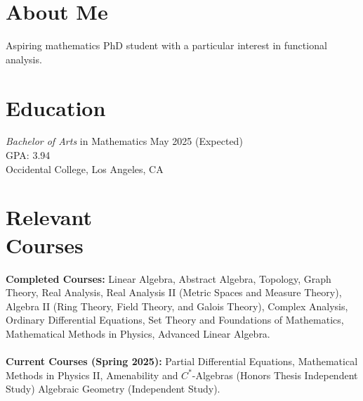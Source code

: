 \documentclass[margin, 12pt]{res} %
\begin{document}
\begin{resume}

\section{\sc About Me}
Aspiring mathematics PhD student with a particular interest in functional analysis.

\section{\sc Education}

{\sl Bachelor of Arts} in Mathematics \hfill May 2025 (Expected) \\
GPA: 3.94\\
Occidental College, Los Angeles, CA 
\section{\sc Relevant \\ Courses}

\textbf{Completed Courses:} Linear Algebra, Abstract Algebra, Topology, Graph Theory, Real Analysis, Real Analysis II (Metric Spaces and Measure Theory), Algebra II (Ring Theory, Field Theory, and Galois Theory), Complex Analysis, Ordinary Differential Equations, Set Theory and Foundations of Mathematics, Mathematical Methods in Physics, Advanced Linear Algebra.\\
\vspace{4pt}\\
\textbf{Current Courses (Spring 2025):} Partial Differential Equations, Mathematical Methods in Physics II, Amenability and $C^{\ast}$-Algebras (Honors Thesis Independent Study) Algebraic Geometry (Independent Study).

\end{resume}
\end{document}
